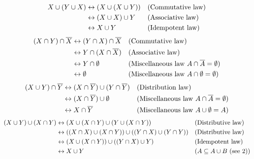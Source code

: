 \begin{solutions}
	\solution\spart\begin{align*}
	X\cup (Y\cup X)&\leftrightarrow (X\cup (X \cup Y)) &&\text{(Commutative law)}\\
	&\leftrightarrow (X\cup X)\cup Y &&\text{(Associative law)}\\
	&\leftrightarrow X\cup Y &&\text{(Idempotent law)}
	\end{align*}
	\spart\begin{align*}
	(X\cap Y)\cap\overline{X}&\leftrightarrow (Y\cap X)\cap\overline{X}&&\text{(Commutative law)}\\
	&\leftrightarrow Y\cap (X\cap\overline{X})&&\text{(Associative law)}\\
	&\leftrightarrow Y\cap \emptyset&&\text{(Miscellaneous law $A\cap \overline{A}=\emptyset$)}\\
	&\leftrightarrow \emptyset &&\text{(Miscellaneous law $A\cap\emptyset=\emptyset$)}
	\end{align*}
	\spart\begin{align*}
	(X\cup Y)\cap \overline{Y}&\leftrightarrow(X\cap \overline{Y})\cup (Y\cap\overline{Y})&&\text{(Distribution law)}\\
	&\leftrightarrow (X\cap\overline{Y})\cup\emptyset&&\text{(Miscellaneous law $A\cap\overline{A}=\emptyset$)}\\
	&\leftrightarrow X\cap\overline{Y}&&\text{(Miscellaneous law $A\cup\emptyset = A$)}
	\end{align*}
	\spart\begin{align*}
	(X\cup Y)\cup (X\cap Y)&\leftrightarrow(X\cup (X\cap Y)\cup (Y\cup (X\cap Y))&&\text{(Distributive law)}\\
	&\leftrightarrow((X\cap X)\cup (X\cap Y))\cup((Y\cap X)\cup (Y\cap Y))&&\text{(Distributive law)}\\
	&\leftrightarrow (X\cup (X\cap Y))\cup ((Y\cap X)\cup Y)&&\text{(Idempotent law)}\\
	&\leftrightarrow X\cup Y&&\text{($A\subseteq A\cup B$ (see 2))}
	\end{align*}


\end{solutions}
